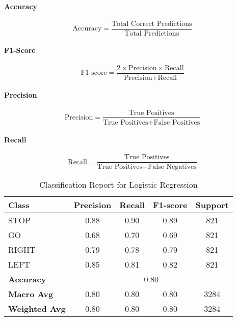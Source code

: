 
\paragraph{Accuracy}
$$
\text{Accuracy} = \frac{\text{Total Correct Predictions}}{\text{Total Predictions}}
$$

\paragraph{F1-Score}
$$
\text{F1-score} = \frac{2 \times \text{Precision} \times \text{Recall}}{\text{Precision} + \text{Recall}}
$$

\paragraph{Precision}
$$
\text{Precision} = \frac{\text{True Positives}}{\text{True Positives} + \text{False Positives}}
$$

\paragraph{Recall}
$$
\text{Recall} = \frac{\text{True Positives}}{\text{True Positives} + \text{False Negatives}}
$$

\begin{table}[h]
\centering
\caption{Classification Report for Logistic Regression}
\begin{tabular}{lcccc}
\hline
\textbf{Class} & \textbf{Precision} & \textbf{Recall} & \textbf{F1-score} & \textbf{Support} \\
\hline
STOP  & 0.88 & 0.90 & 0.89 & 821 \\
GO    & 0.68 & 0.70 & 0.69 & 821 \\
RIGHT & 0.79 & 0.78 & 0.79 & 821 \\
LEFT  & 0.85 & 0.81 & 0.82 & 821 \\
\hline
\textbf{Accuracy} & \multicolumn{4}{c}{0.80} \\
\textbf{Macro Avg} & 0.80 & 0.80 & 0.80 & 3284 \\
\textbf{Weighted Avg} & 0.80 & 0.80 & 0.80 & 3284 \\
\hline
\end{tabular}
\label{tab:classification_report}
\end{table}


